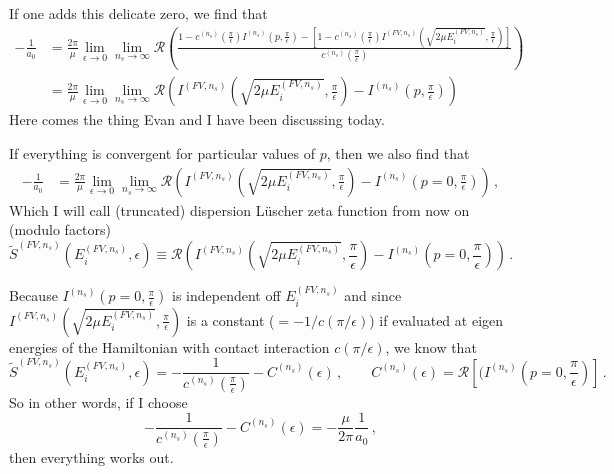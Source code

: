 \documentclass[aps,superscriptaddress,tightenlines,nofootinbib,floatfix,longbibliography,notitlepage]{revtex4-1}
\begin{document}
If one adds this delicate zero, we find that
\begin{align}
	- \frac{1}{a_0}
	&=
	\frac{2 \pi}{\mu}
	\lim\limits_{\epsilon \to 0} \lim\limits_{n_s \to \infty}\mathcal R \left(
		\frac{1 - c^{(n_s)}\left(\frac{\pi}{\epsilon}\right) I^{(n_s)}\left(p, \frac{\pi}{\epsilon}\right)
		-
			\left[1 - c^{(n_s)}\left(\frac{\pi}{\epsilon}\right) I^{(FV, n_s)}\left(\sqrt{2\mu E_i^{(FV, n_s)}}, \frac{\pi}{\epsilon}\right)\right]
		}
		{c^{(n_s)}\left(\frac{\pi}{\epsilon}\right)} 
	\right)
	\\
	&= 
	\frac{2 \pi}{\mu}
	\lim\limits_{\epsilon \to 0} \lim\limits_{n_s \to \infty}\mathcal R \left(
		I^{(FV, n_s)}\left(\sqrt{2\mu E_i^{(FV, n_s)}}, \frac{\pi}{\epsilon}\right)
		-
		I^{(n_s)}\left(p, \frac{\pi}{\epsilon}\right)
	\right)
\end{align}
Here comes the thing Evan and I have been discussing today.

If everything is convergent for particular values of $p$, then we also find that
\begin{align}
	- \frac{1}{a_0}
	&= 
	\frac{2 \pi}{\mu}
	\lim\limits_{\epsilon \to 0} \lim\limits_{n_s \to \infty}\mathcal R \left(
		I^{(FV, n_s)}\left(\sqrt{2\mu E_i^{(FV, n_s)}}, \frac{\pi}{\epsilon}\right)
		-
		I^{(n_s)}\left(p=0, \frac{\pi}{\epsilon}\right)
	\right)
	\, ,
\end{align}
Which I will call (truncated) dispersion Lüscher zeta function from now on (modulo factors)
\begin{equation}
	\tilde S^{(FV, n_s)}(E_i^{(FV, n_s)}, \epsilon)
	\equiv
	\mathcal R \left(
		I^{(FV, n_s)}\left(\sqrt{2\mu E_i^{(FV, n_s)}}, \frac{\pi}{\epsilon}\right)
		-
		I^{(n_s)}\left(p=0, \frac{\pi}{\epsilon}\right)
	\right)
	\, .
\end{equation}

Because $I^{(n_s)}\left(p=0, \frac{\pi}{\epsilon}\right)$ is independent off $E_i^{(FV, n_s)}$ and since $I^{(FV, n_s)}\left(\sqrt{2\mu E_i^{(FV, n_s)}}, \frac{\pi}{\epsilon}\right)$ is a constant ($= - 1 / c(\pi / \epsilon)$) if evaluated at eigen energies of the Hamiltonian with contact interaction $c(\pi / \epsilon)$, we know that 
\begin{equation}
	\tilde S^{(FV, n_s)}(E_i^{(FV, n_s)}, \epsilon)
	=
	- \frac{1}{c^{(n_s)}(\frac{\pi}{\epsilon})} - C^{(n_s)}(\epsilon)
	\,, \qquad
	C^{(n_s)}(\epsilon)
	= 
	\mathcal R \left[(I^{(n_s)}\left(p=0, \frac{\pi}{\epsilon}\right)\right]
	\, .
\end{equation}
So in other words, if I choose
\begin{equation}
	\label{eq:Counterterm-vs-contact}
	- \frac{1}{c^{(n_s)}(\frac{\pi}{\epsilon})} - C^{(n_s)}(\epsilon) = - \frac{\mu}{2 \pi} \frac{1}{a_0} \, ,
\end{equation}
then everything works out.
\end{document}
